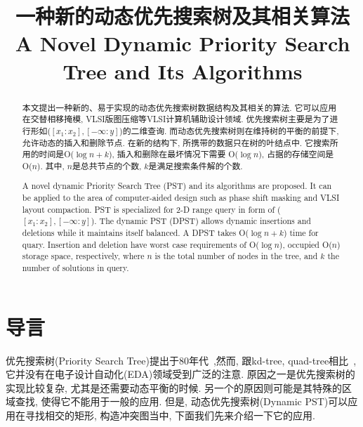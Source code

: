 \documentclass[a4paper]{article}
\begin{document}
\title{一种新的动态优先搜索树及其相关算法 \\A Novel Dynamic Priority Search Tree and Its Algorithms}
\date{}
\maketitle


\renewcommand{\abstractname}{摘要}
\begin{abstract}
本文提出一种新的、易于实现的动态优先搜索树数据结构及其相关的算法. 它可以应用在交替相移掩模, VLSI版图压缩等VLSI计算机辅助设计领域. 优先搜索树主要是为了进行形如($[x_1:x_2],[-\infty:y]$)的二维查询. 而动态优先搜索树则在维持树的平衡的前提下, 
允许动态的插入和删除节点. 在新的结构下, 所携带的数据只在树的叶结点中. 
它搜索所用的时间是O($\log n+k$), 插入和删除在最坏情况下需要
O($\log n$), 占据的存储空间是O($n$). 其中, $n$是总共节点的个数, $k$是满足搜索条件解的个数.
\end{abstract}

\renewcommand{\abstractname}{Abstract}
\begin{abstract}
A novel dynamic Priority Search Tree (PST) and its algorithms are proposed. It can be applied to the area of computer-aided design such as phase shift masking and VLSI layout compaction.
PST is specialized for 2-D range
query in form of ($[x_1:x_2],[-\infty:y]$). The dynamic PST (DPST) allows dynamic
insertions and deletions while it maintains itself balanced. A
DPST takes O($\log n+k$) time for quary. Insertion and
deletion have worst case requirements of O($\log n$), occupied
O($n$) storage space, respectively, where $n$ is the total number of
nodes in the tree, and $k$ the number of solutions in query.
\end{abstract}


\section{导言}

优先搜索树(Priority Search Tree)提出于80年代~\cite{CG_01},然而, 跟kd-tree, quad-tree相比~\cite{CG_03}, 它并没有在电子设计自动化(EDA)领域受到广泛的注意.  
原因之一是优先搜索树的实现比较复杂, 尤其是还需要动态平衡的时候. 
另一个的原因则可能是其特殊的区域查找, 使得它不能用于一般的应用. 但是, 动态优先搜索树(Dynamic PST)可以应用在寻找相交的矩形, 构造冲突图当中, 下面我们先来介绍一下它的应用.
\end{document}
